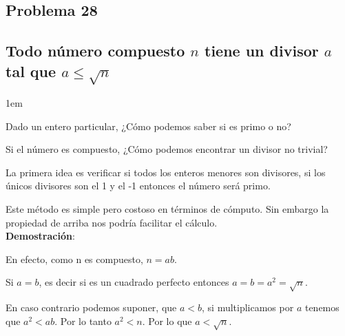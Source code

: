 \documentclass[12pt, fleqn]{article}                             %
\newenvironment{SmallIndentation}[1][0.75em]                    %
    {\begin{adjustwidth}{#1}{}\begin{footnotesize}}                 %
    {\end{footnotesize}\end{adjustwidth}}                           %
\begin{document}
    \clearpage
    \subsection{Problema 28}
    \subsection*{Todo número compuesto $n$ tiene un divisor $a$ tal que $a \leq \sqrt{n}$}

        \begin{SmallIndentation}[1em]

            Dado un entero particular, ¿Cómo podemos saber si es primo o no?

            Si el número es compuesto, ¿Cómo podemos encontrar un divisor no trivial?

            La primera idea es verificar si todos los enteros menores son
            divisores, si los únicos divisores son el 1 y el -1 entonces
            el número será primo.

            Este método es simple pero costoso en términos de cómputo. Sin
            embargo la propiedad de arriba nos podría facilitar el cálculo.\\

            \textbf{Demostración}:

            En efecto, como n es compuesto, $n = ab$.

            Si $a = b$, es decir si es un cuadrado perfecto entonces
            $a = b = a^2 = \sqrt{n}$.

            En caso contrario podemos suponer, que $a<b$, si multiplicamos
            por $a$ tenemos que $a^2<ab$. Por lo tanto $a^2 < n$.
            Por lo que $a < \sqrt{n}$.

        \end{SmallIndentation}
\end{document}
